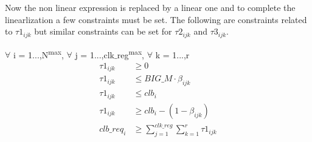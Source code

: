 Now the non linear expression is replaced by a linear one and to complete the linearlization a few constraints must be set. The following are constraints related to $\tau1_{ijk}$ but similar constraints can be set for $\tau2_{ijk}$ and $\tau3_{ijk}$.

\begin{constraint} $\forall$ i = 1...,N\textsuperscript{max}, $\forall$ j = 1...,clk$\_$reg\textsuperscript{max}, $\forall$ k = 1...,r
\begin{equation}
\begin{split}
\tau1_{ijk} & \geq 0 \\
\tau1_{ijk} & \leq BIG\_M \cdot \beta_{ijk} \\ 
\tau1_{ijk} & \leq clb_i \\
\tau1_{ijk} & \geq clb_i - (1 - \beta_{ijk}) \\
clb\_req_i  & \geq \sum_{j=1}^{clk\_reg} \sum_{k=1}^{r} \tau1_{ijk}
\end{split}
\end{equation}
\end{constraint}


